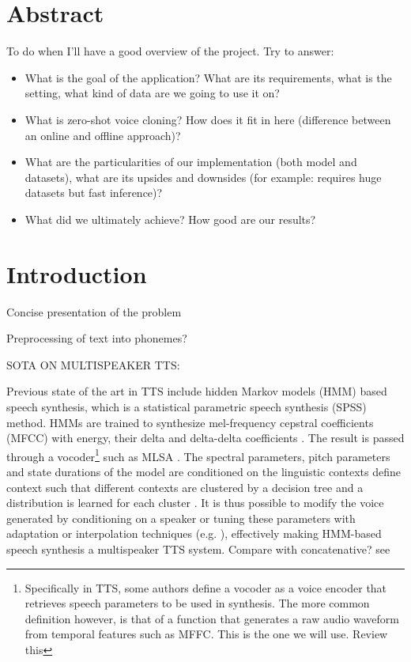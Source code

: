 \documentclass[a4paper, oneside]{article}
\begin{document}
\section{Abstract}
\color{red}
To do when I'll have a good overview of the project. Try to answer:
\begin{itemize}
	\item What is the goal of the application? What are its requirements, what is the setting, what kind of data are we going to use it on?
	\item What is zero-shot voice cloning? How does it fit in here (difference between an online and offline approach)?
	\item What are the particularities of our implementation (both model and datasets), what are its upsides and downsides (for example: requires huge datasets but fast inference)?
	\item What did we ultimately achieve? How good are our results?
\end{itemize}
\color{black}

\section{Introduction}

\color{red}
Concise presentation of the problem

Preprocessing of text into phonemes?

SOTA ON MULTISPEAKER TTS:

\color{black}
Previous state of the art in TTS include hidden Markov models (HMM) based speech synthesis, which is a statistical parametric speech synthesis (SPSS) method. HMMs are trained to synthesize mel-frequency cepstral coefficients (MFCC) with energy, their delta and delta-delta coefficients \cite{TTSSOTA}. The result is passed through a vocoder\footnote{Specifically in TTS, some authors define a vocoder as a voice encoder that retrieves speech parameters to be used in synthesis. The more common definition however, is that of a function that generates a raw audio waveform from temporal features such as MFFC. This is the one we will use. \color{red} Review this \color{black}} such as MLSA \cite{MLSA}. The spectral parameters, pitch parameters and state durations of the model are conditioned on the linguistic contexts \color{red} define context \color{black} such that different contexts are clustered by a decision tree and a distribution is learned for each cluster \cite{HMMTTS}. It is thus possible to modify the voice generated by conditioning on a speaker or tuning these parameters with adaptation or interpolation techniques (e.g. \cite{HMMSpeakerInterpolation}), effectively making HMM-based speech synthesis a multispeaker TTS system. \color{red} Compare with concatenative? see \cite{SPSSDNN} \color{black}
\end{document}
